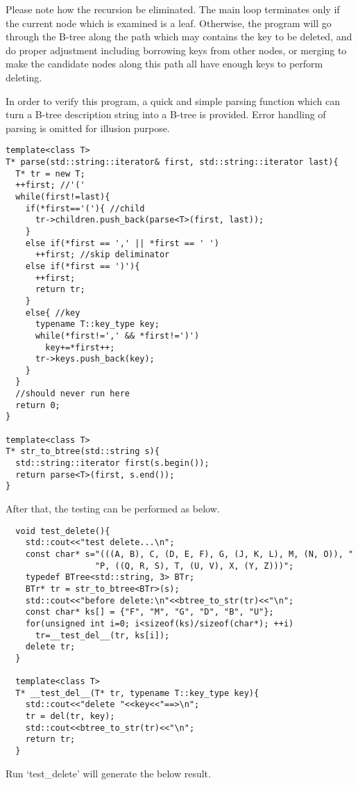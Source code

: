 \documentclass{article}
\begin{document}
Please note how the recursion be eliminated. The main loop terminates
only if the current node which is examined is a leaf. Otherwise, the
program will go through the B-tree along the path which may contains
the key to be deleted, and do proper adjustment including borrowing
keys from other nodes, or merging to make the candidate nodes along
this path all have enough keys to perform deleting.

In order to verify this program, a quick and simple parsing function
which can turn a B-tree description string into a B-tree is provided.
Error handling of parsing is omitted for illusion purpose.

\begin{lstlisting}
template<class T>
T* parse(std::string::iterator& first, std::string::iterator last){
  T* tr = new T;
  ++first; //'('
  while(first!=last){
    if(*first=='('){ //child
      tr->children.push_back(parse<T>(first, last));
    }
    else if(*first == ',' || *first == ' ')
      ++first; //skip deliminator
    else if(*first == ')'){
      ++first;
      return tr;
    }
    else{ //key
      typename T::key_type key;
      while(*first!=',' && *first!=')')
        key+=*first++;
      tr->keys.push_back(key);
    }
  }
  //should never run here
  return 0;
}

template<class T>
T* str_to_btree(std::string s){
  std::string::iterator first(s.begin());
  return parse<T>(first, s.end());
}
\end{lstlisting}

After that, the testing can be performed as below.

\begin{lstlisting}
  void test_delete(){
    std::cout<<"test delete...\n";
    const char* s="(((A, B), C, (D, E, F), G, (J, K, L), M, (N, O)), "
                  "P, ((Q, R, S), T, (U, V), X, (Y, Z)))";
    typedef BTree<std::string, 3> BTr;
    BTr* tr = str_to_btree<BTr>(s);
    std::cout<<"before delete:\n"<<btree_to_str(tr)<<"\n";
    const char* ks[] = {"F", "M", "G", "D", "B", "U"};
    for(unsigned int i=0; i<sizeof(ks)/sizeof(char*); ++i)
      tr=__test_del__(tr, ks[i]);
    delete tr;
  }

  template<class T>
  T* __test_del__(T* tr, typename T::key_type key){
    std::cout<<"delete "<<key<<"==>\n";
    tr = del(tr, key);
    std::cout<<btree_to_str(tr)<<"\n";
    return tr;
  }
\end{lstlisting}

Run `test\_delete' will generate the below result.
\end{document}
